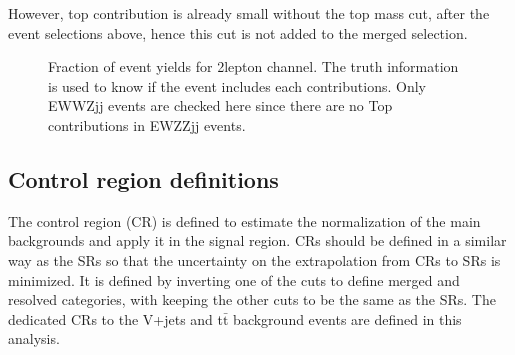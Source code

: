 However, top contribution is already small without the top mass cut, after the event selections above, hence this cut is not added to the merged selection.
\begin{figure}[H]
    \centering
        \caption{Fraction of event yields for 2lepton channel. The truth information is used to know if the event includes each contributions. Only EWWZjj events are checked here since there are no Top contributions in EWZZjj events.}
        \label{fig:TruthTop2LepPurity}
\end{figure}

\subsection{Control region definitions}
The control region (CR) is defined to estimate the normalization of the main backgrounds and apply it in the signal region. 
CRs should be defined in a similar way as the SRs so that the 
uncertainty on the extrapolation from CRs to SRs is minimized.
It is defined by inverting one of the cuts to define merged and resolved categories, with keeping the other cuts to be the same as the SRs.
The dedicated CRs to the V+jets and t$\bar{\mathrm{t}}$ background events are defined in this analysis. \\ \\

